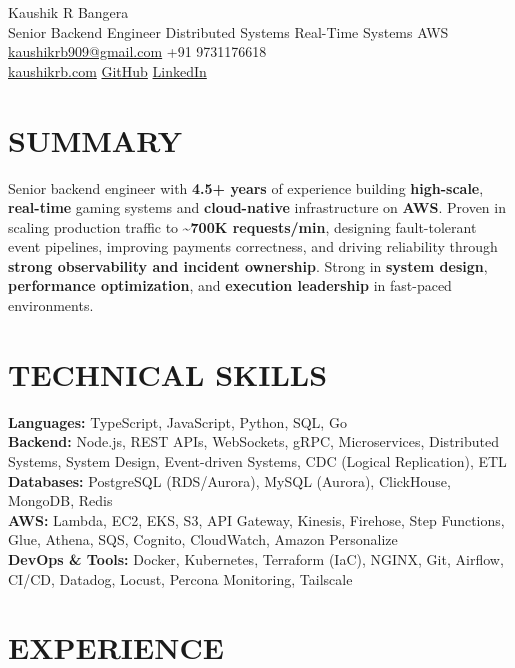 \documentclass[a4paper,10pt]{article}
\begin{document}
\RaggedRight

{\fontsize{26}{30}\selectfont Kaushik R Bangera}\\[2pt]
{\color{accent}\large Senior Backend Engineer \textbar{} Distributed Systems \textbar{} Real-Time Systems \textbar{} AWS}\\[2pt]
\href{mailto:kaushikrb909@gmail.com}{kaushikrb909@gmail.com} \textbar{} +91 9731176618\\
\href{https://kaushikrb.com/?utm_source=resume}{kaushikrb.com} \textbar{} \href{https://github.com/NeuronEnix}{GitHub} \textbar{} \href{https://www.linkedin.com/in/kaushik-r-bangera/}{LinkedIn}

\section*{SUMMARY}
Senior backend engineer with \textbf{4.5+ years} of experience building \textbf{high-scale}, \textbf{real-time} gaming systems and \textbf{cloud-native} infrastructure on \textbf{AWS}. Proven in scaling production traffic to \textbf{\textasciitilde{}700K requests/min}, designing fault-tolerant event pipelines, improving payments correctness, and driving reliability through \textbf{strong observability and incident ownership}. Strong in \textbf{system design}, \textbf{performance optimization}, and \textbf{execution leadership} in fast-paced environments.

\section*{TECHNICAL SKILLS}
\textbf{Languages:} TypeScript, JavaScript, Python, SQL, Go\\
\textbf{Backend:} Node.js, REST APIs, WebSockets, gRPC, Microservices, Distributed Systems, System Design, Event-driven Systems, CDC (Logical Replication), ETL\\
\textbf{Databases:} PostgreSQL (RDS/Aurora), MySQL (Aurora), ClickHouse, MongoDB, Redis\\
\textbf{AWS:} Lambda, EC2, EKS, S3, API Gateway, Kinesis, Firehose, Step Functions, Glue, Athena, SQS, Cognito, CloudWatch, Amazon Personalize\\
\textbf{DevOps \& Tools:} Docker, Kubernetes, Terraform (IaC), NGINX, Git, Airflow, CI/CD, Datadog, Locust, Percona Monitoring, Tailscale

\section*{EXPERIENCE}
\end{document}
